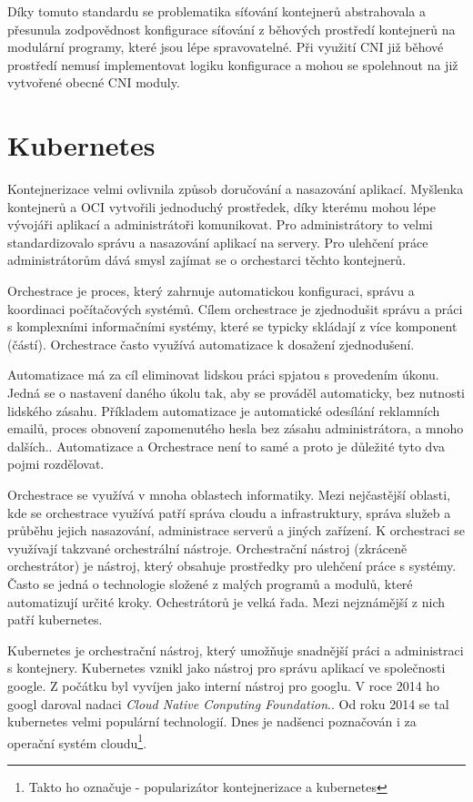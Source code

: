 Díky tomuto standardu se problematika síťování kontejnerů abstrahovala a přesunula zodpovědnost konfigurace síťování z běhových prostředí kontejnerů na modulární programy, které jsou lépe spravovatelné. Při využití CNI již běhové prostředí nemusí implementovat logiku konfigurace a mohou se spolehnout na již vytvořené obecné CNI moduly.
\section{Kubernetes}

Kontejnerizace velmi ovlivnila způsob doručování a nasazování aplikací. Myšlenka kontejnerů a OCI vytvořili jednoduchý prostředek, díky kterému mohou lépe vývojáři aplikací a administrátoři komunikovat. Pro administrátory to velmi standardizovalo správu a nasazování aplikací na servery. Pro ulehčení práce administrátorům dává smysl zajímat se o orchestarci těchto kontejnerů. 

Orchestrace je proces, který zahrnuje automatickou konfiguraci, správu a koordinaci počítačových systémů. Cílem orchestrace je zjednodušit správu a práci s komplexními informačními systémy, které se typicky skládají z více komponent (částí).\cite{redhat_2019_what} Orchestrace často využívá automatizace k dosažení zjednodušení.

Automatizace má za cíl eliminovat lidskou práci spjatou s provedením úkonu. Jedná se o nastavení daného úkolu tak, aby se prováděl automaticky, bez nutnosti lidského zásahu. Příkladem automatizace je automatické odesílání reklamních emailů, proces obnovení zapomenutého hesla bez zásahu administrátora, a mnoho dalších.\cite{watts_2020_it}\cite{redhat_2019_what}. Automatizace a Orchestrace není to samé a proto je důležité tyto dva pojmi rozdělovat. 

Orchestrace se využívá v mnoha oblastech informatiky. Mezi nejčastější oblasti, kde se orchestrace využívá patří správa cloudu a infrastruktury, správa služeb a průběhu jejich nasazování, administrace serverů a jiných zařízení. K orchestraci se využívají takzvané orchestrální nástroje. Orchestrační nástroj (zkráceně orchestrátor) je nástroj, který obsahuje prostředky pro ulehčení práce s systémy. Často se jedná o technologie složené z malých programů a modulů, které automatizují určité kroky. Ochestrátorů je velká řada. Mezi nejznámější z nich patří kubernetes. \cite{goldberg_2019_workflow}

Kubernetes je orchestrační nástroj, který umožňuje snadnější práci a administraci s kontejnery. Kubernetes vznikl jako nástroj pro správu aplikací ve společnosti google. Z počátku byl vyvíjen jako interní nástroj pro googlu. V roce 2014 ho googl daroval nadaci \textit{Cloud Native Conputing Foundation}.\cite{poulton_2022_the}. Od roku 2014 se tal kubernetes velmi populární technologií. Dnes je nadšenci poznačován i za operační systém cloudu\footnote{Takto ho označuje - popularizátor kontejnerizace a kubernetes}. 

